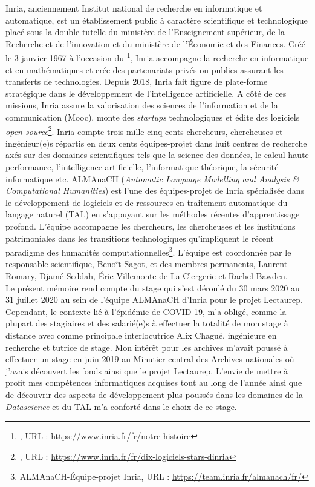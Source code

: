 Inria, anciennement Institut national de recherche en informatique et automatique, est un établissement public à caractère scientifique et technologique placé sous la double tutelle du ministère de l'Enseignement supérieur, de la Recherche et de l'innovation et du ministère de l'Économie et des Finances. Créé le 3 janvier 1967 à l'occasion du \footnote{, URL : \url{https://www.inria.fr/fr/notre-histoire}}, Inria accompagne la recherche en informatique et en mathématiques et crée des partenariats privés ou publics assurant les transferts de technologies. Depuis 2018, Inria fait figure de plate-forme stratégique dans le développement de l'intelligence artificielle. A côté de ces missions, Inria assure la valorisation des sciences de l'information et de la communication (Mooc), monte des \textit{startups} technologiques et édite des logiciels \textit{open-source}\footnote{, URL : \url{https://www.inria.fr/fr/dix-logiciels-stars-dinria}}. Inria compte trois mille cinq cents chercheurs, chercheuses et ingénieur(e)s répartis en deux cents équipes-projet dans huit centres de recherche axés sur des domaines scientifiques tels que la science des données, le calcul haute performance, l'intelligence artificielle, l'informatique théorique, la sécurité informatique etc.  ALMAnaCH (\textit{Automatic Language Modelling and Analysis & Computational Humanities}) est l'une des équipes-projet de Inria spécialisée dans le développement de logiciels et de ressources en traitement automatique du langage naturel (TAL) en s'appuyant sur les méthodes récentes d'apprentissage profond. L'équipe accompagne les chercheurs, les chercheuses et les instituions patrimoniales dans les transitions technologiques qu'impliquent le récent paradigme des humanités computationnelles\footnote{ALMAnaCH-Équipe-projet Inria, URL : \url{https://team.inria.fr/almanach/fr/}}. L'équipe est coordonnée par le responsable scientifique, Benoît Sagot, et des membres permanents, Laurent Romary, Djamé Seddah, Éric Villemonte de La Clergerie et Rachel Bawden.\\

Le présent mémoire rend compte du stage qui s'est déroulé du 30 mars 2020 au 31 juillet 2020 au sein de l'équipe ALMAnaCH d'Inria pour le projet Lectaurep. Cependant, le contexte lié à l'épidémie de COVID-19, m'a obligé, comme la plupart des stagiaires et des salarié(e)s à effectuer la totalité de mon stage à distance avec comme principale interlocutrice Alix Chagué, ingénieure en recherche et tutrice de stage. Mon intérêt pour les archives m'avait poussé à effectuer un stage en juin 2019 au Minutier central des Archives nationales où j'avais découvert les fonds ainsi que le projet Lectaurep. L'envie de mettre à profit mes compétences informatiques acquises tout au long de l'année ainsi que de découvrir des aspects de développement plus poussés dans les domaines de la \textit{Datascience} et du TAL m'a conforté dans le choix de ce stage.\\

